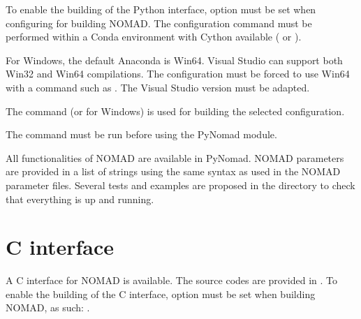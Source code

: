 \documentclass[letterpaper,10pt,english]{sphinxmanual}
\begin{document}
\sphinxAtStartPar
To enable the building of the Python interface, option  must be
set when configuring for building NOMAD. The configuration command  must be performed within a Conda environment with Cython available ( or ).

\sphinxAtStartPar
For Windows, the default Anaconda is Win64. Visual Studio can support both Win32 and Win64 compilations.
The configuration must be forced to use Win64 with a command such as .
The Visual Studio version must be adapted.

\sphinxAtStartPar
The command  (or  for Windows) is used for building the selected configuration.

\sphinxAtStartPar
The command  must be run before using the PyNomad module.

\sphinxAtStartPar
All functionalities of NOMAD are available in PyNomad.
NOMAD parameters are provided in a list of strings using the same syntax as used in the NOMAD parameter
files.
Several tests and examples are proposed in the  directory to check that everything is up and
running.


\chapter{C interface}
\label{\detokenize{LibraryMode:c-interface}}
\sphinxAtStartPar
A C interface for NOMAD is available.
The source codes are provided in .
To enable the building of the C interface, option  must be
set when building NOMAD, as such: .
\end{document}
